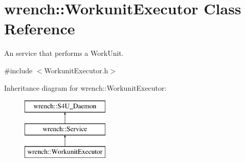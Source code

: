 \hypertarget{classwrench_1_1_workunit_executor}{}\section{wrench\+:\+:Workunit\+Executor Class Reference}
\label{classwrench_1_1_workunit_executor}


An service that performs a Work\+Unit.  




{\ttfamily \#include $<$Workunit\+Executor.\+h$>$}

Inheritance diagram for wrench\+:\+:Workunit\+Executor\+:\begin{figure}[H]
\begin{center}
\leavevmode
\includegraphics[height=3.000000cm]{classwrench_1_1_workunit_executor}
\end{center}
\end{figure}
